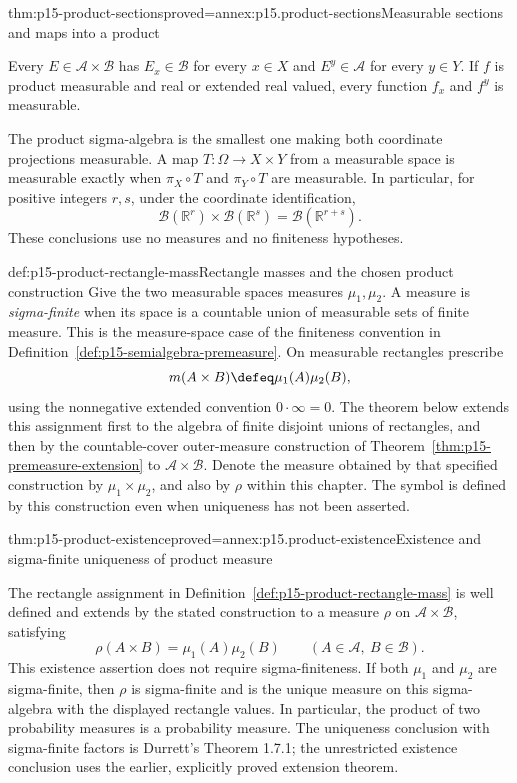 \begin{hbtheorem}{thm:p15-product-sections}{proved=annex:p15.product-sections}{Measurable sections and maps into a product}
\par\nobreak
Every \(E\in\mathcal A\times\mathcal B\) has \(E_x\in\mathcal B\)
for every \(x\in X\) and \(E^y\in\mathcal A\) for every \(y\in Y\).
If \(f\) is product measurable and real or extended real valued,
every function \(f_x\) and \(f^y\) is measurable.

The product sigma-algebra is the smallest one making both coordinate
projections measurable. A map \(T:\Omega\to X\times Y\) from
a measurable space is measurable exactly when \(\pi_X\circ T\)
and \(\pi_Y\circ T\) are measurable. In particular, for positive
integers \(r,s\), under the coordinate identification,
\[
 \mathcal B(\mathbb R^r)\times\mathcal B(\mathbb R^s)
                       =\mathcal B(\mathbb R^{r+s}).
\]
These conclusions use no measures and no finiteness hypotheses.
\end{hbtheorem}

\begin{hbdefinition}{def:p15-product-rectangle-mass}{Rectangle masses and the chosen product construction}
Give the two measurable spaces measures \(\mu_1,\mu_2\).
A measure is \emph{sigma-finite} when its space is a countable union
of measurable sets of finite measure. This is the measure-space case
of the finiteness convention in Definition~\ref{def:p15-semialgebra-premeasure}.
On measurable rectangles prescribe
\[
 m(A\times B)\defeq\mu_1(A)\mu_2(B),
\]
using the nonnegative extended convention \(0\cdot\infty=0\).
The theorem below extends this assignment first to the algebra of finite
disjoint unions of rectangles, and then by the countable-cover
outer-measure construction of Theorem~\ref{thm:p15-premeasure-extension}
to \(\mathcal A\times\mathcal B\). Denote the measure obtained by
that specified construction by \(\mu_1\times\mu_2\), and also by
\(\rho\) within this chapter. The symbol is defined by this construction
even when uniqueness has not been asserted.
\end{hbdefinition}

\begin{hbtheorem}{thm:p15-product-existence}{proved=annex:p15.product-existence}{Existence and sigma-finite uniqueness of product measure}
\par\nobreak
The rectangle assignment in Definition~\ref{def:p15-product-rectangle-mass}
is well defined and extends by the stated construction to a measure
\(\rho\) on \(\mathcal A\times\mathcal B\), satisfying
\[
 \rho(A\times B)=\mu_1(A)\mu_2(B)
       \qquad(A\in\mathcal A,\ B\in\mathcal B).
\]
This existence assertion does not require sigma-finiteness. If both
\(\mu_1\) and \(\mu_2\) are sigma-finite, then \(\rho\) is
sigma-finite and is the unique measure on this sigma-algebra with the
displayed rectangle values. In particular, the product of two probability
measures is a probability measure. The uniqueness conclusion with
sigma-finite factors is Durrett's Theorem 1.7.1; the unrestricted existence
conclusion uses the earlier, explicitly proved extension theorem.
\end{hbtheorem}

